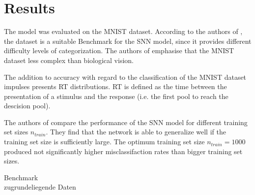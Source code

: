 \section{Results}
\label{sec:result}
The model was evaluated on the MNIST dataset.
According to the authors of \cite{STDP_like}, the dataset is a suitable Benchmark for the \ac{SNN} model, 
since it provides different difficulty levels of categorization.
The authors of \cite{STDP_like} emphasise that the MNIST dataset less complex than biological vision.

The addition to accuracy with regard to the classification of the MNIST dataset impulses \cite{STDP_like} presents \ac{RT} distributions.
\ac{RT} is defined as the time between the presentation of a stimulus and the response (i.e. the first pool to reach the descision pool).

The authors of \cite{STDP_like} compare the performance of the \ac{SNN} model for different training set sizes $n_{train}$.
They find that the network is able to generalize well if the training set size is sufficiently large.
The optimum training set size $n_{train} = 1000$ produced not significantly higher misclassifaction rates than bigger training set sizes.

Benchmark\\
zugrundeliegende Daten